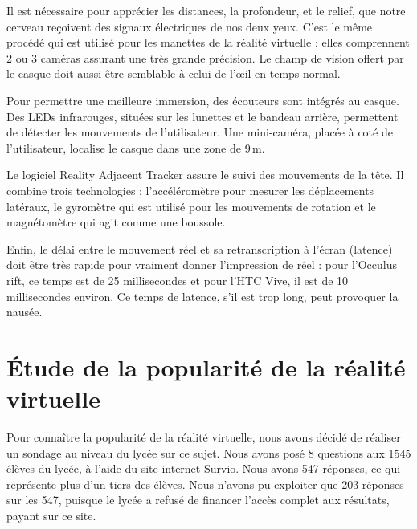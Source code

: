 \documentclass[12pt, a4paper]{report}
\begin{document}
Il est nécessaire pour apprécier les distances, la profondeur, et le relief, que notre cerveau reçoivent des signaux électriques de nos deux yeux. C'est le même procédé qui est utilisé pour les manettes de la réalité virtuelle : elles comprennent 2 ou 3 caméras assurant une très grande précision.
Le champ de vision offert par le casque doit aussi être semblable à celui de l'\oe{}il en temps normal.

Pour permettre une meilleure immersion, des écouteurs sont intégrés au casque.
Des LEDs infrarouges, situées sur les lunettes et le bandeau arrière, permettent de détecter les mouvements de l'utilisateur. Une mini-caméra, placée à coté de l'utilisateur, localise le casque dans une zone de 9\,m.

Le logiciel Reality Adjacent Tracker assure le suivi des mouvements de la tête. Il combine trois technologies : l'accéléromètre pour mesurer les déplacements latéraux, le gyromètre qui est utilisé pour les mouvements de rotation et le magnétomètre qui agit comme une boussole.

Enfin, le délai entre le mouvement réel et sa retranscription à l'écran (latence) doit être très rapide pour vraiment donner l'impression de réel : pour l'Occulus rift, ce temps est de 25 millisecondes et pour l'HTC Vive, il est de 10 millisecondes environ. Ce temps de latence, s'il est trop long, peut provoquer la nausée.

\section[\'{E}tude statistique]{\'{E}tude de la popularité de la réalité virtuelle}

Pour connaître la popularité de la réalité virtuelle, nous avons décidé de réaliser un sondage au niveau du lycée sur ce sujet. Nous avons posé 8 questions aux 1545 élèves du lycée, à l'aide du site internet Survio. Nous avons 547 réponses, ce qui représente plus d'un tiers des élèves. Nous n'avons pu exploiter que 203 réponses sur les 547, puisque le lycée a refusé de financer l'accès complet aux résultats, payant sur ce site.
\end{document}
